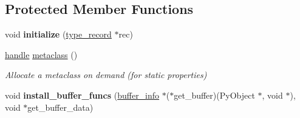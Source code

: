 \subsection*{Protected Member Functions}
\begin{DoxyCompactItemize}
\item 
void {\bfseries initialize} (\hyperlink{structtype__record}{type\+\_\+record} $\ast$rec)\hypertarget{classgeneric__type_ab28936a0a349bf18747cfa6b3da24231}{}\label{classgeneric__type_ab28936a0a349bf18747cfa6b3da24231}

\item 
\hyperlink{classhandle}{handle} \hyperlink{classgeneric__type_a66b2858213a766b22a79f0cca0d72faa}{metaclass} ()\hypertarget{classgeneric__type_a66b2858213a766b22a79f0cca0d72faa}{}\label{classgeneric__type_a66b2858213a766b22a79f0cca0d72faa}

\begin{DoxyCompactList}\small\item\em Allocate a metaclass on demand (for static properties) \end{DoxyCompactList}\item 
void {\bfseries install\+\_\+buffer\+\_\+funcs} (\hyperlink{structbuffer__info}{buffer\+\_\+info} $\ast$($\ast$get\+\_\+buffer)(Py\+Object $\ast$, void $\ast$), void $\ast$get\+\_\+buffer\+\_\+data)\hypertarget{classgeneric__type_abc4faaa9d97d488abb99634dc3f0b88f}{}\label{classgeneric__type_abc4faaa9d97d488abb99634dc3f0b88f}

\end{DoxyCompactItemize}
